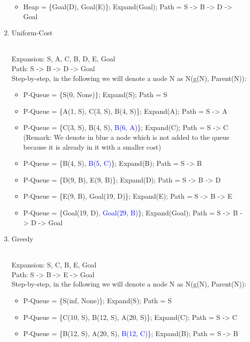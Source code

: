 \documentclass[9pt,a4paper]{extarticle}
\newenvironment{solution}
    {%
    \color{red}
    }
    { 
    \color{black}
    }
\newcommand{\blue}[1]{\textcolor{blue}{#1}}
\begin{document}
\begin{enumerate}
\begin{solution}
\begin{itemize}
            \item Heap = \{Goal(D), Goal(E)\}; Expand(Goal); Path = S -> B -> D -> Goal
        \end{itemize}
        \end{solution}
        \item Uniform-Cost
        \begin{solution}
        \\
        Expansion: S, A, C, B, D, E, Goal\\
        Path: S -> B -> D -> Goal\\
        Step-by-step, in the following we will denote a node N as N(g(N), Parent(N)):
        \begin{itemize}
            \item P-Queue = \{S(0, None)\}; Expand(S); Path = S
            \item P-Queue = \{A(1, S), C(3, S), B(4, S)\}; Expand(A); Path = S -> A
            \item P-Queue = \{C(3, S), B(4, S), \blue{B(6, A)}\}; Expand(C); Path = S -> C
            (Remark: We denote in blue a node which is not added to the queue because it is already in it with a smaller cost)
            \item P-Queue = \{B(4, S), \blue{B(5, C)}\}; Expand(B); Path = S -> B
            \item P-Queue = \{D(9, B), E(9, B)\}; Expand(D); Path = S -> B -> D
            \item P-Queue = \{E(9, B), Goal(19, D)\}; Expand(E); Path = S -> B -> E
            \item P-Queue = \{Goal(19, D), \blue{Goal(29, B)}\}; Expand(Goal); Path = S -> B -> D -> Goal
        \end{itemize}
        \end{solution}
        \item Greedy
        \begin{solution}
        \\
        Expansion: S, C, B, E, Goal\\
        Path: S -> B -> E -> Goal\\
        Step-by-step, in the following we will denote a node N as N(g(N), Parent(N)):
        \begin{itemize}
            \item P-Queue = \{S(inf, None)\}; Expand(S); Path = S
            \item P-Queue = \{C(10, S), B(12, S), A(20, S)\}; Expand(C); Path = S -> C
            \item P-Queue = \{B(12, S), A(20, S), \blue{B(12, C)}\}; Expand(B); Path = S -> B

\end{itemize}
\end{solution}
\end{enumerate}
\end{document}
